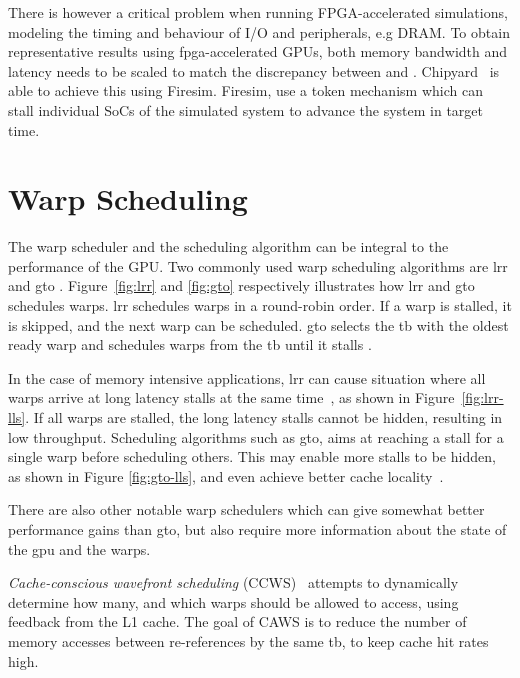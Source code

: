 There is however a critical problem when running FPGA-accelerated simulations, modeling the timing and behaviour of I/O and peripherals\cite{chipyard}, e.g DRAM. To obtain representative results using \acrshort{fpga}-accelerated GPUs, both memory bandwidth and latency needs to be scaled to match the discrepancy between  and . Chipyard~\cite{chipyard} is able to achieve this using Firesim\cite{firesim}. Firesim, use a token mechanism which can stall individual SoCs of the simulated system to advance the system in target time.

\section{Warp Scheduling} \label{sec:warp_scheduling}

The warp scheduler and the scheduling algorithm can be integral to the performance of the GPU. Two commonly used warp scheduling algorithms are \acrfull{lrr} and \acrfull{gto} \cite{improving_gpgpu_scheduling}. Figure~\ref{fig:lrr} and \ref{fig:gto} respectively illustrates how \acrshort{lrr} and \acrshort{gto} schedules warps. \acrshort{lrr} schedules warps in a round-robin order. If a warp is stalled, it is skipped, and the next warp can be scheduled. \acrshort{gto} selects the \acrshort{tb} with the oldest ready warp and schedules warps from the \acrshort{tb} until it stalls \cite{cache-conscious_wavefront_scheduling}. 

In the case of memory intensive applications, \acrshort{lrr} can cause situation where all warps arrive at long latency stalls at the same time~\cite{ZHANG2018520}, as shown in Figure~\ref{fig:lrr-lls}. If all warps are stalled, the long latency stalls cannot be hidden, resulting in low throughput. Scheduling algorithms such as \acrshort{gto}, aims at reaching a stall for a single warp before scheduling others. This may enable more stalls to be hidden, as shown in Figure \ref{fig:gto-lls}, and even achieve better cache locality~\cite{cache-conscious_wavefront_scheduling, ZHANG2018520}.

There are also other notable warp schedulers which can give somewhat better performance gains than \acrshort{gto}, but also require more information about the state of the \acrshort{gpu} and the warps.

\textit{Cache-conscious wavefront scheduling} (CCWS)~\cite{cache-conscious_wavefront_scheduling} attempts to dynamically determine how many, and which warps should be allowed to access, using feedback from the L1 cache. The goal of CAWS is to reduce the number of memory accesses between re-references by the same \acrshort{tb}, to keep cache hit rates high.

